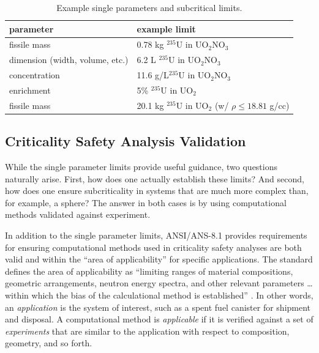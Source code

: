 \begin{table}[ht]
    \caption{Example single parameters and subcritical limits.}
    \begin{center} 
    \begin{tabular*}{0.90\textwidth}{@{\extracolsep{\fill}} ll } 
      \toprule 
	parameter &  example limit \\
      \midrule
       fissile mass                    &  0.78 kg ${}^{235}$U in UO$_2$NO$_3$ \\
       dimension (width, volume, etc.) &  6.2   L ${}^{235}$U in UO$_2$NO$_3$ \\
       concentration                   &  11.6 g/L${}^{235}$U in UO$_2$NO$_3$ \\
       enrichment                      &  5\%     ${}^{235}$U in UO$_2$       \\
       fissile mass                    &  20.1 kg ${}^{235}$U in UO$_2$ 
                                          (w/ $\rho \leq 18.81$ g/cc) \\
      \bottomrule 
    \end{tabular*} 
    \end{center} 
    \label{tbl:controlparams}
\end{table}



\subsection*{Criticality Safety Analysis Validation}

While the single parameter limits provide useful guidance, two questions 
naturally arise.  First, how does one actually establish these limits?  And 
second, how does one ensure subcriticality in systems that are much more 
complex than, for example, a sphere?  The answer in both cases is by using 
computational methods validated against experiment.

In addition to the single parameter limits, ANSI/ANS-8.1 provides 
requirements for ensuring computational methods used in criticality safety 
analyses are both valid and within the ``area of applicability'' for specific 
applications. The standard defines the area of applicability as ``limiting 
ranges of material compositions, geometric arrangements, neutron energy 
spectra, and other relevant parameters \ldots within which the bias of the 
calculational method is established'' \cite{ans8}.  In other words, an 
\textit{application} is the system of interest, such as a spent fuel canister 
for shipment and disposal. A computational method is \textit{applicable} if 
it is verified against a set of \textit{experiments} that are similar to the 
application with respect to composition, geometry, and so forth.

